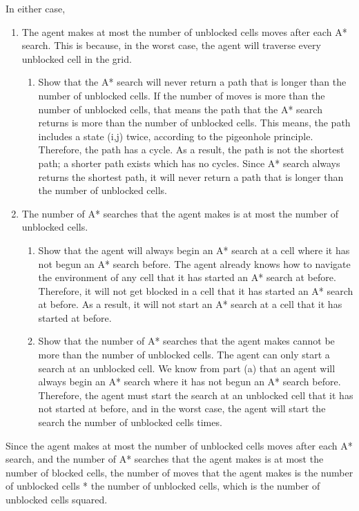 \documentclass{article}
\begin{document}
In either case, 
\begin{enumerate}
	\item The agent makes at most the number of unblocked cells moves after each A* search. This is because, in the worst case, the agent will traverse every unblocked cell in the grid. 
	\begin{enumerate}
		\item Show that the A* search will never return a path that is longer than the number of unblocked cells.  If the number of moves is more than the number of unblocked cells, that means the path that the A* search returns is more than the number of unblocked cells. This means, the path includes a state (i,j) twice, according to the pigeonhole principle. Therefore, the path has a cycle. As a result, the path is not the shortest path; a shorter path exists which has no cycles. Since A* search always returns the shortest path, it will never return a path that is longer than the number of unblocked cells.
	\end{enumerate}
	\item The number of A* searches that the agent makes is at most the number of unblocked cells.
	\begin{enumerate}
		\item Show that the agent will always begin an A* search at a cell where it has not begun an A* search before.  The agent already knows how to navigate the environment of any cell that it has started an A* search at before. Therefore, it will not get blocked in a cell that it has started an A* search at before. As a result, it will not start an A* search at a cell that it has started at before. 
		\item Show that the number of A* searches that the agent makes cannot be more than the number of unblocked cells. The agent can only start a search at an unblocked cell. We know from part (a) that an agent will always begin an A* search where it has not begun an A* search before. Therefore, the agent must start the search at an unblocked cell that it has not started at before, and in the worst case, the agent will start the search the number of unblocked cells times.
	\end{enumerate} 
\end {enumerate}
Since the agent makes at most the number of unblocked cells moves after each A* search, and the number of A* searches that the agent makes is at most the number of blocked cells, the number of moves that the agent makes is the number of unblocked cells * the number of unblocked cells, which is the number of unblocked cells squared.\\
\end{document}
